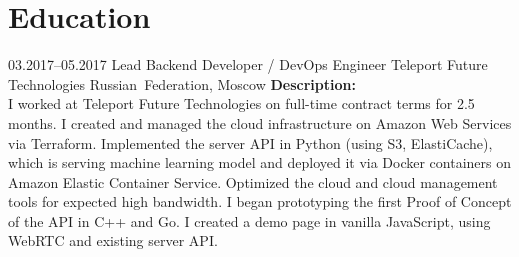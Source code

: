 \documentclass[12pt,a4paper,oneside,final]{moderncv}
\begin{document}
\section{Education}

\cventry
{03.2017--05.2017}
{Lead Backend Developer / DevOps Engineer}
{Teleport Future Technologies}
{Russian~Federation, Moscow}
{}
{
  \textbf{Description:}\\
  {\parindent=1cm
    I worked at Teleport Future Technologies on full-time contract terms for 2.5 months. I created and managed the cloud infrastructure on Amazon Web Services via Terraform. Implemented the server API in Python (using S3, ElastiCache), which is serving machine learning model and deployed it via Docker containers on Amazon Elastic Container Service. Optimized the cloud and cloud management tools for expected high bandwidth. I began prototyping the first Proof of Concept of the API in C++ and Go. I created a demo page in vanilla JavaScript, using WebRTC and existing server API.
  }
}
\end{document}
